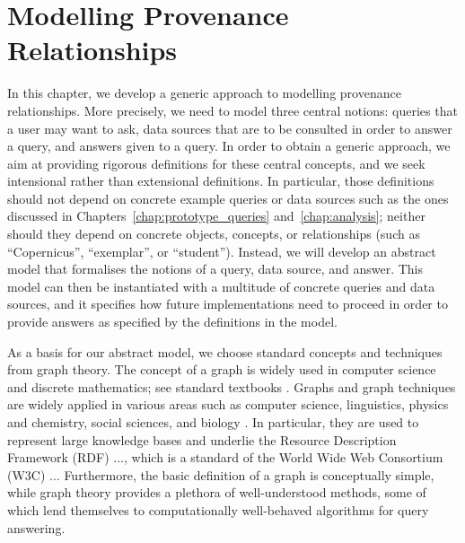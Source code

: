 \chapter{Modelling Provenance Relationships}
\label{chap:modelling}

  
In this chapter, we develop a generic approach to modelling provenance relationships.
More precisely, we need to model three central notions: queries that a user may want to ask,
data sources that are to be consulted in order to answer a query,
and answers given to a query.
In order to obtain a generic approach, we aim at providing rigorous definitions
for these central concepts, and we seek intensional rather than extensional definitions.
In particular, those definitions should not depend on concrete example queries or data sources
such as the ones discussed in Chapters~\ref{chap:prototype_queries} and~\ref{chap:analysis};
neither should they depend on concrete objects, concepts, or relationships
(such as \enquote{Copernicus}, \enquote{exemplar}, or \enquote{student}).
Instead, we will develop an abstract model that formalises
the notions of a query, data source, and answer.
This model can then be instantiated with a multitude of concrete queries and data sources,
and it specifies how future implementations need to proceed in order to
provide answers as specified by the definitions in the model.

As a basis for our abstract model, we choose standard concepts and techniques
from graph theory.
The concept of a graph is widely used in computer science and discrete mathematics;
see standard textbooks \autocite[e.g.,][]{Diestel2012}.
Graphs and graph techniques are widely applied in various areas such as 
computer science, linguistics, physics and chemistry,
social sciences, and biology \autocite{WikiGraphTheoryApplications}.
In particular, they are used to represent large knowledge bases \autocite[e.g.,][]{Ehrlinger2016}
and underlie the Resource Description Framework (RDF) ..., which is a standard of the
World Wide Web Consortium (W3C) ... 
Furthermore, the basic definition of a graph is conceptually simple,
while graph theory provides a plethora of well-understood methods,
some of which lend themselves to computationally well-behaved algorithms for query answering. 

